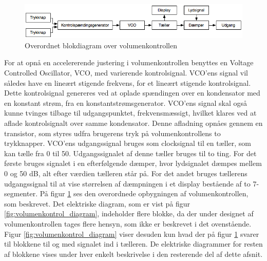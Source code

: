 \begin{figure}[h]
\centering
\includegraphics[scale=0.5]{teknisk/volumenkontrol/blokdiagram-volumenkontrol.png}
\caption{Overordnet blokdiagram over volumenkontrollen}
\label{fig:blokdiagram_volumenkontrol}
\end{figure}

For at opnå en accelererende justering i volumenkontrollen benyttes en Voltage Controlled Oscillator, VCO, med varierende kontrolsignal. VCO'ens signal vil således have en lineært stigende frekvens, for et lineært stigende kontrolsignal. Dette kontrolsignal genereres ved at oplade spændingen over en kondensator med en konstant strøm, fra en konstantstrømsgenerator. VCO'ens signal skal også kunne tvinges tilbage til udgangspunktet, frekvensmæssigt, hvilket klares ved at aflade kontrolsignalt over samme kondensator. Denne afladning opnåes gennem en transistor, som styres udfra brugerens tryk på volumenkontrollens to trykknapper. VCO'ens udgangssignal bruges som clocksignal til en tæller, som kan tælle fra 0 til 50. Udgangssignalet af denne tæller bruges til to ting. For det første bruges signalet i en efterfølgende dæmper, hvor lydsignalet dæmpes mellem 0 og 50 dB, alt efter værdien tælleren står på. For det andet bruges tællerens udgangssignal til at vise størrelsen af dæmpningen i et display bestående af to 7-segmenter.
På figur \ref{fig:blokdiagram_volumenkontrol} ses den overordnede opbygningen af volumenkontrollen, som beskrevet. Det elektriske diagram, som er vist på figur \ref{fig:volumenkontrol_diagram}, indeholder flere blokke, da der under designet af volumenkontrollen tages flere hensyn, som ikke er beskrevet i det ovenstående. Figur \ref{fig:volumenkontrol_diagram} viser desuden kun hvad der på figur \ref{fig:blokdiagram_volumenkontrol} svarer til blokkene til og med signalet ind i tælleren. De elektriske diagrammer for resten af blokkene vises under hver enkelt beskrivelse i den resterende del af dette afsnit.
